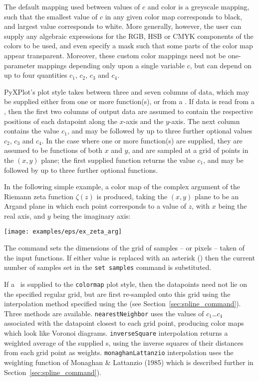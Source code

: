 The default mapping used between values of $c$ and color is a greyscale
mapping, such that the smallest value of $c$ in any given color map
corresponds to black, and largest value corresponds to white. More generally,
however, the user can supply any algebraic expressions for the RGB, HSB or CMYK
components of the colors to be used, and even specify a mask such that some
parts of the color map appear transparent. Moreover, these custom color
mappings need not be one-parameter mappings depending only upon a single
variable $c$, but can depend on up to four quantities $c_1$, $c_2$, $c_3$ and
$c_4$.

PyXPlot's  plot style takes between three and seven columns
of data, which may be supplied either from one or more function(s), or from a
\datafile. If data is read from a \datafile, then the first two columns of
output data are assumed to contain the respective positions of each datapoint
along the $x$-axis and the $y$-axis. The next column contains the value $c_1$,
and may be followed by up to three further optional values $c_2$, $c_3$ and
$c_4$. In the case where one or more function(s) are supplied, they are assumed
to be functions of both $x$ and $y$, and are sampled at a grid of points in the
$(x,y)$ plane; the first supplied function returns the value $c_1$, and may be
followed by up to three further optional functions.

In the following simple example, a color map of the complex argument of the
Riemann zeta function $\zeta(z)$ is produced, taking the $(x,y)$ plane to be an
Argand plane in which each point corresponds to a value of $z$, with $x$ being
the real axis, and $y$ being the imaginary axis:

\vspace{2mm}

\vspace{2mm}
\centerline{\texttt{[image: examples/eps/ex\_zeta\_arg]}}

The command  sets the dimensions of the grid of
samples -- or pixels -- taken of the input functions. If either value is
replaced with an asterisk ({\tt *}) then the current number of samples set in
the {\tt set samples} command is substituted.

If a \datafile\ is supplied to the {\tt colormap} plot style, then the
datapoints need not lie on the specified regular grid, but are first re-sampled
onto this grid using the interpolation method specified using the  (see Section~\ref{sec:spline_command}). Three methods are
available. {\tt nearest\-Neigh\-bor} uses the values of $c_1$\ldots$c_4$
associated with the datapoint closest to each grid point, producing color maps
which look like Voronoi diagrams. {\tt inverse\-Square} interpolation returns a
weighted average of the supplied \datapoint s, using the inverse squares of
their distances from each grid point as weights. {\tt monag\-han\-Lattan\-zio}
interpolation uses the weighting function of Monaghan \& Lattanzio (1985) which
is described further in Section~\ref{sec:spline_command}).

